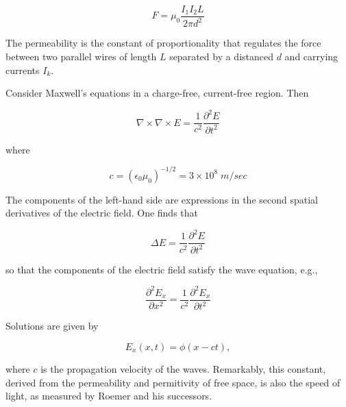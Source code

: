 \begin{equation}
\label{amperes_law}
  F = \mu_0 \frac{I_1I_2L}{2\pi d^2}
\end{equation}

The permeability is the constant of proportionality that
regulates the force between two parallel wires of length $L$
separated by a distanced $d$ and carrying currents $I_k$.

Consider
Maxwell's equations in a charge-free, current-free region.  Then

\begin{equation}
\nabla\times\nabla\times E =  \frac{1}{c^2} \frac{\partial^2 E}{\partial t^2}
\end{equation}

where

\begin{equation}
c = (\epsilon_0\mu_0)^{-1/2} = 3\times 10^8\; m/sec
\end{equation}

The components of the left-hand side are expressions in the 
second spatial derivatives of the electric field.  One finds
that 

\begin{equation}
\Delta E =  \frac{1}{c^2} \frac{\partial^2 E}{\partial t^2}
\end{equation}

so that the components of the electric field satisfy the wave
equation, e.g.,

\begin{equation}
 \frac{\partial^2 E_x}{\partial x^2}= \frac{1}{c^2} \frac{\partial^2 E_x}{\partial t^2}
\end{equation}

Solutions are given by

\begin{equation}
 E_x(x,t) = \phi(x - ct),
\end{equation}

where $c$ is the propagation velocity of the waves.  Remarkably,
this constant, derived from the permeability and permitivity
of free space, is also the speed of light, as measured by Roemer
and his successors.


